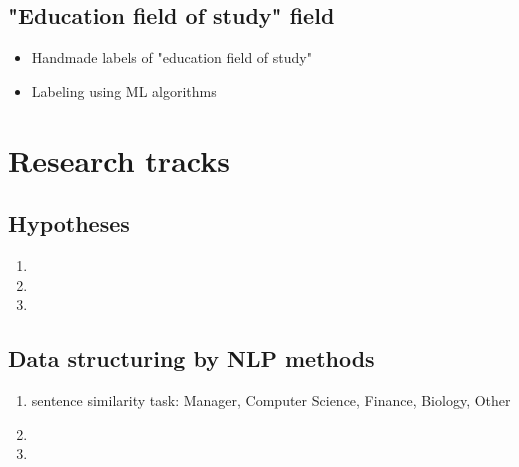 \documentclass[12pt]{article}
\theoremstyle{plain}
\theoremstyle{definition}
\begin{document}
\subsection{"Education field of study" field}

\begin{itemize}
    \item Handmade labels of "education field of study"
    \item Labeling using ML algorithms
    
   
\end{itemize}

\section{Research tracks}

\subsection{Hypotheses}

\begin{enumerate}
    \item 
    \item 
    \item 
\end{enumerate}

\subsection{Data structuring by NLP methods}

\begin{enumerate}
    \item sentence similarity task: Manager, Computer Science, Finance, Biology, Other
    \item 
    \item 
\end{enumerate}
\end{document}
